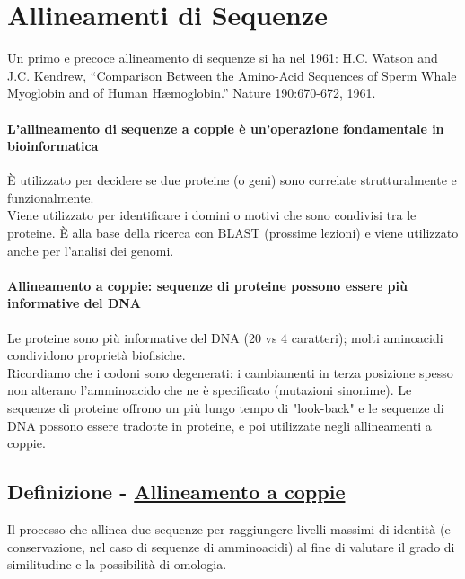 \documentclass{article}
\begin{document}
\section{Allineamenti di Sequenze}
Un primo e precoce allineamento di sequenze si ha nel 1961: H.C. Watson and J.C. Kendrew,
“Comparison Between the Amino-Acid Sequences of Sperm Whale Myoglobin and of Human Hæmoglobin.” Nature 190:670-672, 1961.\\
\paragraph{L'allineamento di sequenze a coppie è un'operazione fondamentale in bioinformatica}
È utilizzato per decidere se due proteine (o geni) sono correlate strutturalmente e funzionalmente.\\
Viene utilizzato per identificare i domini o motivi che sono
condivisi tra le proteine. È alla base della ricerca con BLAST (prossime lezioni) e viene utilizzato anche per l'analisi dei genomi.
\paragraph{Allineamento a coppie: sequenze di proteine possono essere più informative del DNA}
Le proteine sono più informative del DNA (20 vs 4 caratteri);
molti aminoacidi condividono proprietà biofisiche.\\
Ricordiamo che i codoni sono degenerati: i cambiamenti in terza posizione
spesso non alterano l'amminoacido che ne è specificato
(mutazioni sinonime). Le sequenze di proteine offrono un più lungo tempo di
"look-back" e le sequenze di DNA possono essere tradotte in proteine,
e poi utilizzate negli allineamenti a coppie.
\subsection{Definizione - \underline{Allineamento a coppie}}
Il processo che allinea due sequenze per
raggiungere livelli massimi di identità (e
conservazione, nel caso di sequenze di
amminoacidi) al fine di valutare il grado di
similitudine e la possibilità di omologia.
\end{document}
